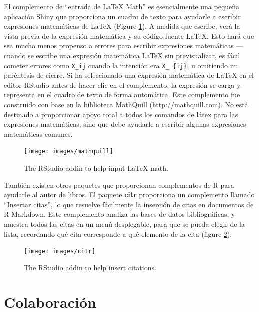 \documentclass[12pt,]{krantz}
\theoremstyle{definition}
\theoremstyle{definition}
\theoremstyle{definition}
\theoremstyle{remark}
\begin{document}
El complemento de ``entrada de LaTeX Math'' es esencialmente una pequeña
aplicación Shiny que proporciona un cuadro de texto para ayudarle a
escribir expresiones matemáticas de LaTeX (Figure \ref{fig:mathquill}).
A medida que escribe, verá la vista previa de la expresión matemática y
su código fuente LaTeX. Esto hará que sea mucho menos propenso a errores
para escribir expresiones matemáticas --- cuando se escribe una
expresión matemática LaTeX sin previsualizar, es fácil cometer errores
como \texttt{X\_ij} cuando la intención era \texttt{X\_\ \{ij\}}, u
omitiendo un paréntesis de cierre. Si ha seleccionado una expresión
matemática de LaTeX en el editor RStudio antes de hacer clic en el
complemento, la expresión se carga y representa en el cuadro de texto de
forma automática. Este complemento fue construido con base en la
biblioteca MathQuill (\url{http://mathquill.com}). No está destinado a
proporcionar apoyo total a todos los comandos de látex para las
expresiones matemáticas, sino que debe ayudarle a escribir algunas
expresiones matemáticas comunes.

\begin{figure}

{\centering \texttt{[image: images/mathquill]} 

}

\caption{The RStudio addin to help input LaTeX math.}\label{fig:mathquill}
\end{figure}

También existen otros paquetes que proporcionan complementos de R para
ayudarle al autor de libros. El paquete \textbf{citr} \citep{R-citr}
proporciona un complemento llamado ``Insertar citas'', lo que resuelve
fácilmente la inserción de citas  en documentos de R
Markdown. Este complemento analiza las bases de datos bibliográficas, y
muestra todos las citas en un menú desplegable, para que se pueda elegir
de la lista, recordando qué cita corresponde a qué elemento de la cita
(figure \ref{fig:citr}).

\begin{figure}

{\centering \texttt{[image: images/citr]} 

}

\caption{The RStudio addin to help insert citations.}\label{fig:citr}
\end{figure}

\section{Colaboración}\label{colaboracion}
\end{document}
